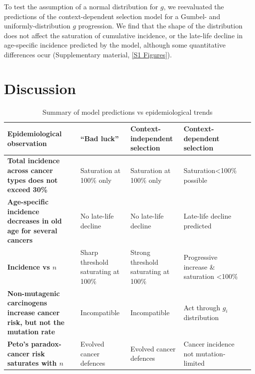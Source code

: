 \documentclass[10pt,twocolumn,twoside]{article}
\begin{document}
To test the assumption of a normal distribution for $g$, we reevaluated the predictions of the context-dependent selection model for a Gumbel- and uniformly-distribution $g$ progression. We find that the shape of the distribution does not affect the saturation of cumulative incidence, or the late-life decline in age-specific incidence predicted by the model, although some quantitative differences ocur (Supplementary material, \ref{S1 Figures}).

\section{Discussion}

\begin{table}[tbhp]
\centering
\begin{threeparttable}
\begin{tabular}{p{5cm}p{4cm}p{4cm}p{3.5cm}p{7cm}}
\textbf{Epidemiological observation} & ``Bad luck'' & Context-independent selection & Context-dependent selection \\
\hline
\textbf{Total incidence across cancer types does not exceed 30\%} & Saturation at 100\% only & Saturation at 100\% only & Saturation<100\% possible \\
\textbf{Age-specific incidence decreases in old age for several cancers} & No late-life decline & No late-life decline & Late-life decline predicted \\
\textbf{Incidence vs $n$} & Sharp threshold saturating at 100\% & Strong threshold saturating at 100\% & Progressive increase \& saturation <100\% \\
\textbf{Non-mutagenic carcinogens increase cancer risk, but not the mutation rate} & Incompatible & Incompatible & Act through $g_{i}$ distribution \\
\textbf{Peto's paradox-cancer risk saturates with $n$} & Evolved cancer defences & Evolved cancer defences & Cancer incidence not mutation-limited \\
\hline
\end{tabular}
\caption{Summary of model predictions vs epidemiological trends}
\end{threeparttable}
\label{Table 1}
\end{table}
\end{document}
